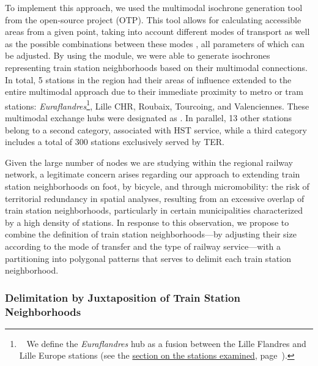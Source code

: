 \begin{refsegment}
To implement this approach, we used the multimodal isochrone generation tool from the open-source project  (OTP). This tool allows for calculating accessible areas from a given point, taking into account different modes of transport as well as the possible combinations between these modes \textcolor{blue}{\autocite[15]{krismer_enhancing_2017}}, all parameters of which can be adjusted. By using the  module, we were able to generate isochrones representing train station neighborhoods based on their multimodal connections. In total, 5 stations in the region had their areas of influence extended to the entire multimodal approach due to their immediate proximity to metro or tram stations: \textsl{Euraflandres}\footnote{~
    We define the \textsl{Euraflandres} hub as a fusion between the Lille Flandres and Lille Europe stations (see the \hyperref[chap3:observation-quantitative-gares-examinees]{section on the stations examined}, page~\pageref{chap3:observation-quantitative-gares-examinees}).
}, Lille CHR, Roubaix, Tourcoing, and Valenciennes. These multimodal exchange hubs were designated as . In parallel, 13 other stations belong to a second category, associated with \acrshort{HST} service, while a third category includes a total of 300 stations exclusively served by \acrshort{TER}.%

Given the large number of nodes we are studying within the regional railway network, a legitimate concern arises regarding our approach to extending train station neighborhoods on foot, by bicycle, and through micromobility: the risk of territorial redundancy in spatial analyses, resulting from an excessive overlap of train station neighborhoods, particularly in certain municipalities characterized by a high density of stations. In response to this observation, we propose to combine the definition of train station neighborhoods—by adjusting their size according to the mode of transfer and the type of railway service—with a partitioning into polygonal patterns that serves to delimit each train station neighborhood.%

\subsubsection*{Delimitation by Juxtaposition of Train Station Neighborhoods
    \label{chap3:quartiers-gare-voronoi}
    }


\end{refsegment}
